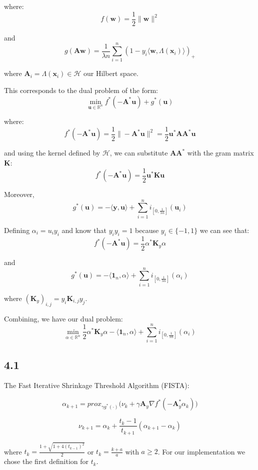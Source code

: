 \documentclass[12pt]{article}
\begin{document}
where:
\[f(\textbf{w}) = \frac{1}{2}\| \textbf{w}\|^2\]

and
\[g(\textbf{A}\textbf{w}) = \frac{1}{\lambda n} \sum_{i=1}^{n} (1-y_i \langle \textbf{w}, \Lambda(\textbf{x}_i)\rangle)_{+}\]

where $\textbf{A}_i = \Lambda(\textbf{x}_i) \in \mathcal{H}$ our Hilbert space.

This corresponds to the dual problem of the form:
\[\min_{\textbf{u} \in \mathbb{R}^{n}} f^*(-\textbf{A}^*\textbf{u}) + g^*(\textbf{u})\]

where:
\[f^*(-\textbf{A}^*\textbf{u}) = \frac{1}{2}\| -\textbf{A}^*\textbf{u}\|^2 = \frac{1}{2} \textbf{u}^*\textbf{A} \textbf{A}^*\textbf{u}\]

and using the kernel defined by $\mathcal{H}$, we can substitute $\textbf{A} \textbf{A}^*$ with the gram matrix $\textbf{K}$:
\[f^*(-\textbf{A}^*\textbf{u}) = \frac{1}{2} \textbf{u}^*\textbf{K}\textbf{u}\]

Moreover,
\[g^*(\textbf{u}) = - \langle \textbf{y}, \textbf{u}\rangle + \sum_{i=1}^{n} i_{\left[0, \frac{1}{\lambda n}\right]}(\textbf{u}_i)\]

Defining $\alpha_i = u_i y_i$ and know that $y_i y_i = 1$ because $y_i \in \{-1, 1\}$ we can see that:
\[f^*(-\textbf{A}^*\textbf{u}) = \frac{1}{2} \alpha^*\textbf{K}_y\alpha\]

and
\[g^*(\textbf{u}) = - \langle \textbf{1}_n, \alpha \rangle + \sum_{i=1}^{n} i_{\left[0, \frac{1}{\lambda n}\right]}(\alpha_i)\]

where $(\textbf{K}_y)_{i, j} = y_i \textbf{K}_{i, j} y_j$.

Combining, we have our dual problem:
\[\min_{\alpha \in \mathbb{R}^n} \frac{1}{2} \alpha^*\textbf{K}_y\alpha - \langle \textbf{1}_n, \alpha \rangle + \sum_{i=1}^{n} i_{\left[0, \frac{1}{\lambda n}\right]}(\alpha_i)\]

\newpage
\subsection*{4.1}

The Fast Iterative Shrinkage Threshold Algorithm (FISTA):

\[\alpha_{k+1} = prox_{\gamma g^*(\cdot)}\bigg(\nu_k + \gamma \textbf{A}_y \nabla f^*(-\textbf{A}_y^* \alpha_{k})\bigg)\]

\[\nu_{k+1} = \alpha_{k} + \frac{t_k - 1}{t_{k+1}}(\alpha_{k+1}-\alpha_{k})\]

where $t_k = \frac{1+\sqrt{1+ 4 (t_{k-1})^2}}{2}$ or $t_k = \frac{k+a}{a}$ with $a \geq 2$. For our implementation we chose the first definition for $t_k$.
\end{document}
